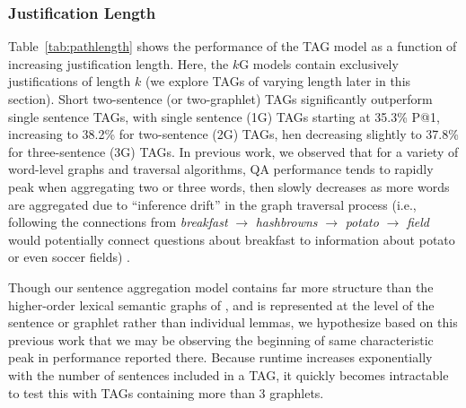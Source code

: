 \subsubsection{Justification Length}
\label{sec-cl2017:pathlength}
Table~\ref{tab:pathlength} shows the performance of the TAG model as a function of increasing justification length.
Here, the $k$G models contain exclusively justifications of length $k$ (we explore TAGs of varying length later in this section).
Short two-sentence (or two-graphlet) TAGs significantly outperform single sentence TAGs, with single sentence (1G) TAGs starting at 35.3\% P@1, increasing to 38.2\% for two-sentence (2G) TAGs, hen decreasing slightly to 37.8\% for three-sentence (3G) TAGs. 
In previous work, we observed that for a variety of word-level graphs and traversal algorithms, QA performance tends to rapidly peak when aggregating two or three words, then slowly decreases as more words are aggregated due to ``inference drift'' in the graph 
traversal process
(i.e., following the connections from \emph{breakfast} $\rightarrow$ \emph{hashbrowns} $\rightarrow$ \emph{potato} $\rightarrow$ \emph{field} would potentially connect questions about breakfast to information about potato or even soccer fields)   \citep{fried2015higher}.  

Though our sentence aggregation model contains far more structure than the higher-order lexical semantic graphs of \citet{fried2015higher}, and is represented at the level of the sentence or graphlet rather than individual lemmas, we hypothesize based on this previous work that we may be observing the beginning of same characteristic peak in performance reported there.  Because runtime increases exponentially with the number of sentences included in a TAG, it quickly becomes intractable to test this with TAGs containing more than 3 graphlets. 


